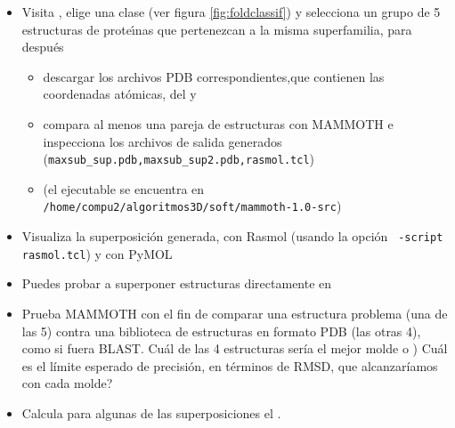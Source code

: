 \begin{itemize}

\item Visita , 
elige una clase (ver figura \ref{fig:foldclassif})
y selecciona un grupo de 5 estructuras de prote\'\i{}nas que pertenezcan a la misma superfamilia, para despu\'{e}s
\begin{itemize}
\item descargar los archivos PDB correspondientes,que contienen las coordenadas at\'{o}micas,  del
 y
\item compara al menos una pareja de estructuras con MAMMOTH %
e inspecciona los archivos de salida generados (\verb+maxsub_sup.pdb,maxsub_sup2.pdb,rasmol.tcl+)
\item (el ejecutable se encuentra en \verb+/home/compu2/algoritmos3D/soft/mammoth-1.0-src+)
\end{itemize}
 
\item Visualiza la superposici\'{o}n generada,  con Rasmol (usando la opci\'{o}n \verb+ -script rasmol.tcl+) y con PyMOL

\item Puedes probar a superponer estructuras directamente en 

\item Prueba MAMMOTH con el fin de comparar una estructura problema (una de las 5) contra una biblioteca
de estructuras en formato PDB (las otras 4), como si fuera BLAST. Cu\'{a}l de las 4 estructuras ser\'{i}a el mejor molde o )
Cu\'{a}l es el l\'{i}mite esperado de precisi\'{o}n, en t\'{e}rminos de RMSD, que alcanzar\'{i}amos con cada molde?

\item Calcula para algunas de las superposiciones el .

\end{itemize}

